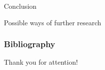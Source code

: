 \begin{frame}{Conclusion}

\end{frame}

\begin{frame}{Possible ways of further research}

\end{frame}

\begin{frame}[t,allowframebreaks] %

\nocite{confbib1}
\nocite{confbib2}
\nocite{bib1}
\nocite{bib2}
\nocite{scbib1}
\nocite{vakbib1}
\nocite{vakbib2}
\nocite{wosbib1}
\frametitle{Bibliography}
\end{frame}


\begin{frame} %
    \begin{center}
        \Huge
        Thank you for attention!
    \end{center}
\end{frame} 